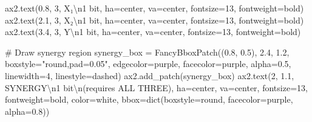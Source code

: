 \documentclass[
  11pt,
  letterpaper,
  oneside,
  openany]{book}
\newenvironment{Shaded}{\begin{snugshade}}{\end{snugshade}}
\newcommand{\BuiltInTok}[1]{\textcolor[rgb]{0.00,0.23,0.31}{#1}}
\newcommand{\CharTok}[1]{\textcolor[rgb]{0.13,0.47,0.30}{#1}}
\newcommand{\CommentTok}[1]{\textcolor[rgb]{0.37,0.37,0.37}{#1}}
\newcommand{\DecValTok}[1]{\textcolor[rgb]{0.68,0.00,0.00}{#1}}
\newcommand{\FloatTok}[1]{\textcolor[rgb]{0.68,0.00,0.00}{#1}}
\newcommand{\NormalTok}[1]{\textcolor[rgb]{0.00,0.23,0.31}{#1}}
\newcommand{\OperatorTok}[1]{\textcolor[rgb]{0.37,0.37,0.37}{#1}}
\newcommand{\StringTok}[1]{\textcolor[rgb]{0.13,0.47,0.30}{#1}}
\begin{document}
\begin{Shaded}
\begin{Highlighting}[]
\NormalTok{ax2.text(}\FloatTok{0.8}\NormalTok{, }\DecValTok{3}\NormalTok{, }\StringTok{\textquotesingle{}X₁}\CharTok{\textbackslash{}n}\StringTok{1 bit\textquotesingle{}}\NormalTok{, ha}\OperatorTok{=}\StringTok{\textquotesingle{}center\textquotesingle{}}\NormalTok{, va}\OperatorTok{=}\StringTok{\textquotesingle{}center\textquotesingle{}}\NormalTok{, fontsize}\OperatorTok{=}\DecValTok{13}\NormalTok{, fontweight}\OperatorTok{=}\StringTok{\textquotesingle{}bold\textquotesingle{}}\NormalTok{)}
\NormalTok{ax2.text(}\FloatTok{2.1}\NormalTok{, }\DecValTok{3}\NormalTok{, }\StringTok{\textquotesingle{}X₂}\CharTok{\textbackslash{}n}\StringTok{1 bit\textquotesingle{}}\NormalTok{, ha}\OperatorTok{=}\StringTok{\textquotesingle{}center\textquotesingle{}}\NormalTok{, va}\OperatorTok{=}\StringTok{\textquotesingle{}center\textquotesingle{}}\NormalTok{, fontsize}\OperatorTok{=}\DecValTok{13}\NormalTok{, fontweight}\OperatorTok{=}\StringTok{\textquotesingle{}bold\textquotesingle{}}\NormalTok{)}
\NormalTok{ax2.text(}\FloatTok{3.4}\NormalTok{, }\DecValTok{3}\NormalTok{, }\StringTok{\textquotesingle{}Y}\CharTok{\textbackslash{}n}\StringTok{1 bit\textquotesingle{}}\NormalTok{, ha}\OperatorTok{=}\StringTok{\textquotesingle{}center\textquotesingle{}}\NormalTok{, va}\OperatorTok{=}\StringTok{\textquotesingle{}center\textquotesingle{}}\NormalTok{, fontsize}\OperatorTok{=}\DecValTok{13}\NormalTok{, fontweight}\OperatorTok{=}\StringTok{\textquotesingle{}bold\textquotesingle{}}\NormalTok{)}

\CommentTok{\# Draw synergy region}
\NormalTok{synergy\_box }\OperatorTok{=}\NormalTok{ FancyBboxPatch((}\FloatTok{0.8}\NormalTok{, }\FloatTok{0.5}\NormalTok{), }\FloatTok{2.4}\NormalTok{, }\FloatTok{1.2}\NormalTok{, boxstyle}\OperatorTok{=}\StringTok{"round,pad=0.05"}\NormalTok{,}
\NormalTok{                              edgecolor}\OperatorTok{=}\StringTok{\textquotesingle{}purple\textquotesingle{}}\NormalTok{, facecolor}\OperatorTok{=}\StringTok{\textquotesingle{}purple\textquotesingle{}}\NormalTok{, }
\NormalTok{                              alpha}\OperatorTok{=}\FloatTok{0.5}\NormalTok{, linewidth}\OperatorTok{=}\DecValTok{4}\NormalTok{, linestyle}\OperatorTok{=}\StringTok{\textquotesingle{}dashed\textquotesingle{}}\NormalTok{)}
\NormalTok{ax2.add\_patch(synergy\_box)}
\NormalTok{ax2.text(}\DecValTok{2}\NormalTok{, }\FloatTok{1.1}\NormalTok{, }\StringTok{\textquotesingle{}SYNERGY}\CharTok{\textbackslash{}n}\StringTok{1 bit}\CharTok{\textbackslash{}n}\StringTok{(requires ALL THREE)\textquotesingle{}}\NormalTok{, ha}\OperatorTok{=}\StringTok{\textquotesingle{}center\textquotesingle{}}\NormalTok{, va}\OperatorTok{=}\StringTok{\textquotesingle{}center\textquotesingle{}}\NormalTok{,}
\NormalTok{         fontsize}\OperatorTok{=}\DecValTok{13}\NormalTok{, fontweight}\OperatorTok{=}\StringTok{\textquotesingle{}bold\textquotesingle{}}\NormalTok{, color}\OperatorTok{=}\StringTok{\textquotesingle{}white\textquotesingle{}}\NormalTok{,}
\NormalTok{         bbox}\OperatorTok{=}\BuiltInTok{dict}\NormalTok{(boxstyle}\OperatorTok{=}\StringTok{\textquotesingle{}round\textquotesingle{}}\NormalTok{, facecolor}\OperatorTok{=}\StringTok{\textquotesingle{}purple\textquotesingle{}}\NormalTok{, alpha}\OperatorTok{=}\FloatTok{0.8}\NormalTok{))}


\end{Highlighting}
\end{Shaded}
\end{document}
